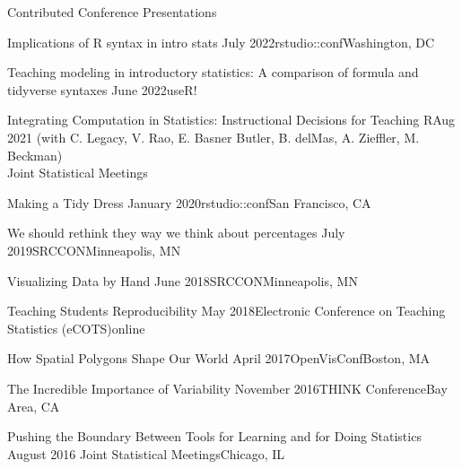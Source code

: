 \documentclass{resume} %
\begin{document}
\begin{rSection}{Contributed Conference Presentations}

\begin{sSubsection}{Implications of R syntax in intro stats}{ }{July 2022}{rstudio::conf}{Washington, DC}
\end{sSubsection}

\begin{sSubsection}{Teaching modeling in introductory statistics: A comparison of formula and tidyverse syntaxes}{ }{June 2022}{useR!}{ }
\end{sSubsection}

\begin{sSubsection}{Integrating Computation in Statistics: Instructional Decisions for Teaching R}{}{Aug 2021 }{(with C. Legacy, V. Rao, E. Basner Butler, B. delMas, A. Zieffler, M. Beckman) \hfill }{ }
\\Joint Statistical Meetings
\end{sSubsection}

\begin{sSubsection}{Making a Tidy Dress}{ }{January 2020}{rstudio::conf}{San Francisco, CA}
\end{sSubsection}

\begin{sSubsection}{We should rethink they way we think about percentages}{ }{July 2019}{SRCCON}{Minneapolis, MN}
\end{sSubsection}

\begin{sSubsection}{Visualizing Data by Hand}{ }{June 2018}{SRCCON}{Minneapolis, MN}
\end{sSubsection}

\begin{sSubsection}{Teaching Students Reproducibility}{ }{May 2018}{Electronic Conference on Teaching Statistics (eCOTS)}{online}
\end{sSubsection}

\begin{sSubsection}{How Spatial Polygons Shape Our World}{ }{April 2017}{OpenVisConf}{Boston, MA}
\end{sSubsection}

\begin{sSubsection}{The Incredible Importance of Variability}{ }{November 2016}{THINK Conference}{Bay Area, CA}
\end{sSubsection}

\begin{sSubsection}{Pushing the Boundary Between Tools for Learning and for Doing Statistics}{ }{August 2016 }{Joint Statistical Meetings}{Chicago, IL}
\end{sSubsection}


\end{rSection}
\end{document}
